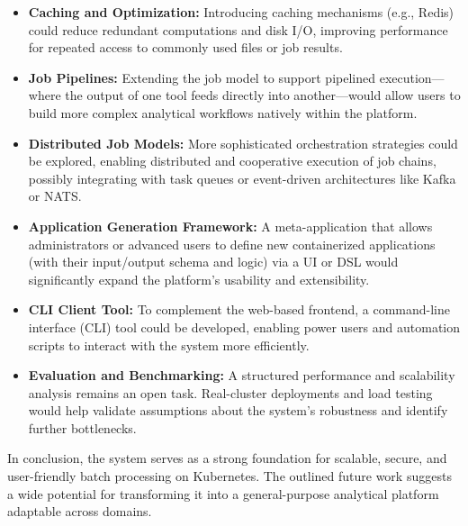 \begin{itemize}
    \item \textbf{Caching and Optimization:} Introducing caching mechanisms (e.g., Redis) could reduce redundant computations and disk I/O, improving performance for repeated access to commonly used files or job results.
    
    \item \textbf{Job Pipelines:} Extending the job model to support pipelined execution—where the output of one tool feeds directly into another—would allow users to build more complex analytical workflows natively within the platform.
    
    \item \textbf{Distributed Job Models:} More sophisticated orchestration strategies could be explored, enabling distributed and cooperative execution of job chains, possibly integrating with task queues or event-driven architectures like Kafka or NATS.
    
    \item \textbf{Application Generation Framework:} A meta-application that allows administrators or advanced users to define new containerized applications (with their input/output schema and logic) via a UI or DSL would significantly expand the platform’s usability and extensibility.
    
    \item \textbf{CLI Client Tool:} To complement the web-based frontend, a command-line interface (CLI) tool could be developed, enabling power users and automation scripts to interact with the system more efficiently.
    
    \item \textbf{Evaluation and Benchmarking:} A structured performance and scalability analysis remains an open task. Real-cluster deployments and load testing would help validate assumptions about the system’s robustness and identify further bottlenecks.
\end{itemize}

In conclusion, the system serves as a strong foundation for scalable, secure, and user-friendly batch processing on Kubernetes. The outlined future work suggests a wide potential for transforming it into a general-purpose analytical platform adaptable across domains.
